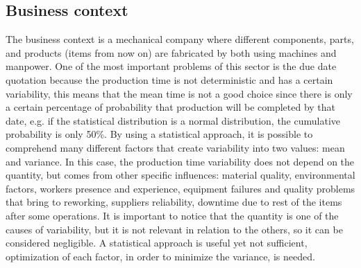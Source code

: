 \documentclass[a4paper,12pt]{article}
\begin{document}
\subsection{Business context}
The business context is a mechanical company where different components, parts, and products (items from now on) are fabricated by both using machines and manpower. One of the most important problems of this sector is the due date quotation because the production time is not deterministic and has a certain variability, this means that the mean time is not a good choice since there is only a certain percentage of probability that production will be completed by that date, e.g. if the statistical distribution is a normal distribution,  the cumulative probability is only 50\%. By using a statistical approach, it is possible to comprehend many different factors that create variability into two values: mean and variance. In this case, the production time variability does not depend on the quantity, but comes from other specific influences: material quality, environmental factors, workers presence and experience, equipment failures and quality problems that bring to reworking, suppliers reliability, downtime due to rest of the items after some operations. It is important to notice that the quantity is one of the causes of variability, but it is not relevant in relation to the others, so it can be considered negligible. A statistical approach is useful yet not sufficient, optimization of each factor, in order to minimize the variance, is needed.\\
\end{document}
